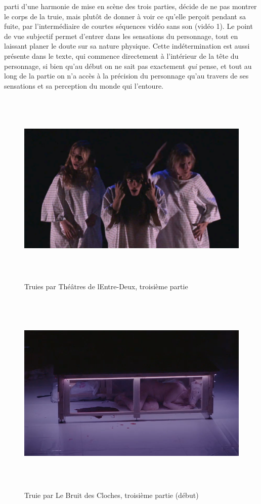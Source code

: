 \documentclass[
]{article}
\begin{document}
parti d'une harmonie de mise en scène des trois parties, décide de ne pas montrer le corps de la truie, mais plutôt de donner à voir ce qu'elle perçoit pendant sa fuite, par l'intermédiaire de courtes séquences vidéo sans son (vidéo 1). Le point de vue subjectif permet d'entrer dans les sensations du personnage, tout en laissant planer le doute sur sa nature physique. Cette indétermination est aussi présente dans le texte, qui commence directement à l'intérieur de la tête du personnage, si bien qu'au début on ne sait pas exactement \emph{qui }pense, et tout au long de la partie on n'a accès à la précision du personnage qu'au travers de ses sensations et sa perception du monde qui l'entoure.

\begin{figure}
\centering
\includegraphics[width=17cm,height=9.463cm]{../assets/Pictures/10000201000004F4000002C2B712E44AAF95EAF0.png}
\caption{Truies par Théâtres de l\textquotesingle Entre-Deux, troisième partie}\label{fig:fig-1-4}
\end{figure}

\begin{figure}
\centering
\includegraphics[width=16.887cm,height=9.888cm]{../assets/Pictures/10000201000002C30000019E3152FCACF0A1D307.png}
\caption{Truie par Le Bruit des Cloches, troisième partie (début)}\label{fig:fig-1-5}
\end{figure}
\end{document}
